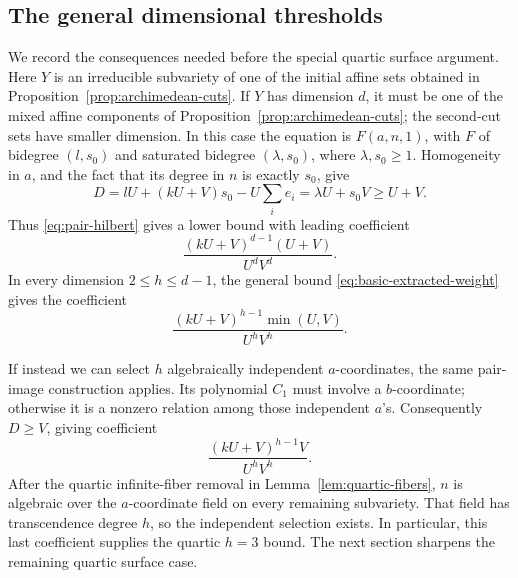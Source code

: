 \subsection{The general dimensional thresholds}

We record the consequences needed before the special quartic
surface argument.  Here \(Y\) is an irreducible subvariety of one of
the initial affine sets obtained in
Proposition~\ref{prop:archimedean-cuts}.  If \(Y\) has dimension \(d\), it must be
one of the mixed affine components of
Proposition~\ref{prop:archimedean-cuts}; the second-cut sets have
smaller dimension.  In this case the equation is
\(F(a,n,1)\), with \(F\) of bidegree \((l,s_0)\) and saturated
bidegree \((\lambda,s_0)\), where \(\lambda,s_0\geq1\).
Homogeneity in \(a\), and the fact that its degree in \(n\)
is exactly \(s_0\), give
\[
 D=lU+(kU+V)s_0-U\sum_i e_i
   =\lambda U+s_0V\geq U+V.
\]
Thus \eqref{eq:pair-hilbert} gives a lower bound with leading
coefficient
\[
 \frac{(kU+V)^{d-1}(U+V)}{U^dV^d}.
\]
In every dimension \(2\leq h\leq d-1\), the general bound
\eqref{eq:basic-extracted-weight} gives the coefficient
\[
 \frac{(kU+V)^{h-1}\min(U,V)}{U^hV^h}.
\]

If instead we can select \(h\) algebraically independent
\(a\)-coordinates, the same pair-image construction applies.
Its polynomial \(C_1\) must involve a \(b\)-coordinate; otherwise
it is a nonzero relation among those independent \(a\)'s.
Consequently \(D\geq V\), giving coefficient
\[
 \frac{(kU+V)^{h-1}V}{U^hV^h}.
\]
After the quartic infinite-fiber removal in
Lemma~\ref{lem:quartic-fibers}, \(n\) is algebraic over the
\(a\)-coordinate field on every remaining subvariety.
That field has transcendence degree \(h\), so the independent
selection exists.  In particular, this last coefficient supplies
the quartic \(h=3\) bound.  The next section sharpens the
remaining quartic surface case.

